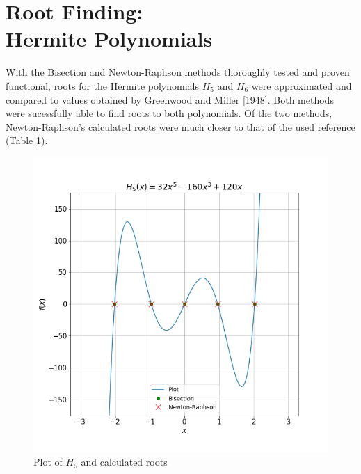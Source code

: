 \documentclass[twocolumn]{article}
\begin{document}
\section{Root Finding:\\Hermite Polynomials}
With the Bisection and Newton-Raphson methods thoroughly tested and proven functional, roots for the
Hermite polynomials $H_5$ and $H_6$ were approximated and compared to values obtained by Greenwood and Miller [1948].
Both methods were sucessfully able to find roots to both polynomials. Of the two methods, Newton-Raphson's calculated
roots were much closer to that of the used reference (Table \ref{}).
\begin{figure}[h!]
 \centering
 \includegraphics[scale = 0.4]{h5}
 \caption{Plot of $H_5$ and calculated roots}
 \label{fig:h5}
\end{figure}
\end{document}
